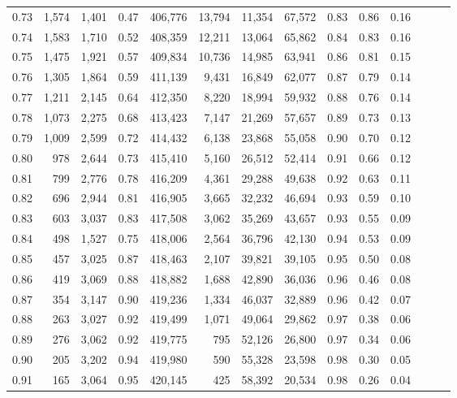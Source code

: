 \begin{tabular}{rrrrrrrrrrrrrr}
0.73 &  1,574 &  1,401 &  0.47 &  406,776 &   13,794 &  11,354 &  67,572 &  0.83 &  0.86 &      0.16 \\
0.74 &  1,583 &  1,710 &  0.52 &  408,359 &   12,211 &  13,064 &  65,862 &  0.84 &  0.83 &      0.16 \\
0.75 &  1,475 &  1,921 &  0.57 &  409,834 &   10,736 &  14,985 &  63,941 &  0.86 &  0.81 &      0.15 \\
0.76 &  1,305 &  1,864 &  0.59 &  411,139 &    9,431 &  16,849 &  62,077 &  0.87 &  0.79 &      0.14 \\
0.77 &  1,211 &  2,145 &  0.64 &  412,350 &    8,220 &  18,994 &  59,932 &  0.88 &  0.76 &      0.14 \\
0.78 &  1,073 &  2,275 &  0.68 &  413,423 &    7,147 &  21,269 &  57,657 &  0.89 &  0.73 &      0.13 \\
0.79 &  1,009 &  2,599 &  0.72 &  414,432 &    6,138 &  23,868 &  55,058 &  0.90 &  0.70 &      0.12 \\
0.80 &    978 &  2,644 &  0.73 &  415,410 &    5,160 &  26,512 &  52,414 &  0.91 &  0.66 &      0.12 \\
0.81 &    799 &  2,776 &  0.78 &  416,209 &    4,361 &  29,288 &  49,638 &  0.92 &  0.63 &      0.11 \\
0.82 &    696 &  2,944 &  0.81 &  416,905 &    3,665 &  32,232 &  46,694 &  0.93 &  0.59 &      0.10 \\
0.83 &    603 &  3,037 &  0.83 &  417,508 &    3,062 &  35,269 &  43,657 &  0.93 &  0.55 &      0.09 \\
0.84 &    498 &  1,527 &  0.75 &  418,006 &    2,564 &  36,796 &  42,130 &  0.94 &  0.53 &      0.09 \\
0.85 &    457 &  3,025 &  0.87 &  418,463 &    2,107 &  39,821 &  39,105 &  0.95 &  0.50 &      0.08 \\
0.86 &    419 &  3,069 &  0.88 &  418,882 &    1,688 &  42,890 &  36,036 &  0.96 &  0.46 &      0.08 \\
0.87 &    354 &  3,147 &  0.90 &  419,236 &    1,334 &  46,037 &  32,889 &  0.96 &  0.42 &      0.07 \\
0.88 &    263 &  3,027 &  0.92 &  419,499 &    1,071 &  49,064 &  29,862 &  0.97 &  0.38 &      0.06 \\
0.89 &    276 &  3,062 &  0.92 &  419,775 &      795 &  52,126 &  26,800 &  0.97 &  0.34 &      0.06 \\
0.90 &    205 &  3,202 &  0.94 &  419,980 &      590 &  55,328 &  23,598 &  0.98 &  0.30 &      0.05 \\
0.91 &    165 &  3,064 &  0.95 &  420,145 &      425 &  58,392 &  20,534 &  0.98 &  0.26 &      0.04 \\

\end{tabular}
